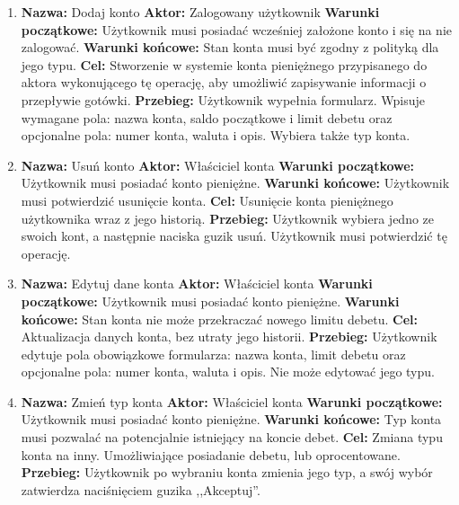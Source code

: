 \begin{enumerate}[labelwidth=\widthof{\ref{last-item}},label=\arabic*.]
\item \textbf{Nazwa:} Dodaj konto \newline
    \textbf{Aktor:} Zalogowany użytkownik \newline
    \textbf{Warunki początkowe:} Użytkownik musi posiadać wcześniej założone konto i się na nie zalogować. \newline
    \textbf{Warunki końcowe:} Stan konta musi być zgodny z polityką dla jego typu. \newline
    \textbf{Cel:} Stworzenie w systemie konta pieniężnego przypisanego do aktora wykonującego tę operację, aby umożliwić zapisywanie informacji o przepływie gotówki. \newline
    \textbf{Przebieg:} Użytkownik wypełnia formularz. Wpisuje wymagane pola: nazwa konta, saldo początkowe i limit debetu oraz opcjonalne pola: numer konta, waluta i opis. Wybiera także typ konta.
\item \textbf{Nazwa:} Usuń konto \newline
    \textbf{Aktor:} Właściciel konta \newline
    \textbf{Warunki początkowe:} Użytkownik musi posiadać konto pieniężne. \newline
    \textbf{Warunki końcowe:} Użytkownik musi potwierdzić usunięcie konta. \newline
    \textbf{Cel:} Usunięcie konta pieniężnego użytkownika wraz z jego historią. \newline
    \textbf{Przebieg:} Użytkownik wybiera jedno ze swoich kont, a następnie naciska guzik usuń. Użytkownik musi potwierdzić tę operację.
\item \textbf{Nazwa:} Edytuj dane konta \newline
    \textbf{Aktor:} Właściciel konta \newline
    \textbf{Warunki początkowe:} Użytkownik musi posiadać konto pieniężne. \newline
    \textbf{Warunki końcowe:} Stan konta nie może przekraczać nowego limitu debetu. \newline
    \textbf{Cel:} Aktualizacja danych konta, bez utraty jego historii. \newline
    \textbf{Przebieg:} Użytkownik edytuje pola obowiązkowe formularza: nazwa konta, limit debetu oraz opcjonalne pola: numer konta, waluta i opis. Nie może edytować jego typu.
\item \textbf{Nazwa:} Zmień typ konta\newline
    \textbf{Aktor:} Właściciel konta \newline
    \textbf{Warunki początkowe:} Użytkownik musi posiadać konto pieniężne. \newline
    \textbf{Warunki końcowe:} Typ konta musi pozwalać na potencjalnie istniejący na koncie debet. \newline
    \textbf{Cel:} Zmiana typu konta na inny. Umożliwiające posiadanie debetu, lub oprocentowane. \newline
    \textbf{Przebieg:} Użytkownik po wybraniu konta zmienia jego typ, a swój wybór zatwierdza naciśnięciem guzika ,,Akceptuj''. 
\end{enumerate}

